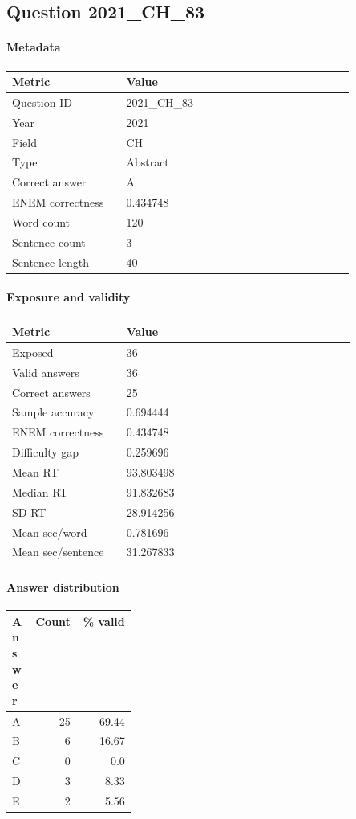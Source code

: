 \subsection*{Question 2021\_CH\_83}
\label{sec:q_2021_CH_83}
\paragraph{Metadata}
\begin{tabular}{p{0.30\linewidth}p{0.60\linewidth}}
\toprule
Metric & Value\\
\midrule
Question ID & 2021\_CH\_83\\
Year & 2021\\
Field & CH\\
Type & Abstract\\
Correct answer & A\\
ENEM correctness & 0.434748\\
Word count & 120\\
Sentence count & 3\\
Sentence length & 40\\
\bottomrule
\end{tabular}

\paragraph{Exposure and validity}
\begin{tabular}{p{0.30\linewidth}p{0.60\linewidth}}
\toprule
Metric & Value\\
\midrule
Exposed & 36\\
Valid answers & 36\\
Correct answers & 25\\
Sample accuracy & 0.694444\\
ENEM correctness & 0.434748\\
Difficulty gap & 0.259696\\
Mean RT & 93.803498\\
Median RT & 91.832683\\
SD RT & 28.914256\\
Mean sec/word & 0.781696\\
Mean sec/sentence & 31.267833\\
\bottomrule
\end{tabular}

\paragraph{Answer distribution}
\begin{tabular}{p{0.18\linewidth}rr}
\toprule
Answer & Count & \% valid\\
\midrule
A & 25 & 69.44\\
B & 6 & 16.67\\
C & 0 & 0.0\\
D & 3 & 8.33\\
E & 2 & 5.56\\
\bottomrule
\end{tabular}


